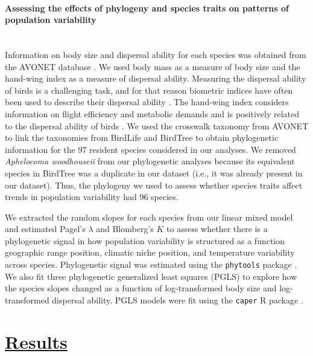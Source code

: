 \paragraph*{Assessing the effects of phylogeny and species traits on patterns of population variability}\mbox{}\\ 
Information on body size and dispersal ability for each species was obtained from the AVONET database \parencite{tobias2022}. We used body mass as a measure of body size and the hand-wing index as a measure of dispersal ability. Measuring the dispersal ability of birds is a challenging task, and for that reason biometric indices have often been used to describe their dispersal ability \parencite{sheard2020}. The hand-wing index considers information on flight efficiency and metabolic demands \parencite{claramunt2012,claramunt2017} and is positively related to the dispersal ability of birds \parencite{arango2022}. We used the crosswalk taxonomy from AVONET \parencite{tobias2022} to link the taxonomies from BirdLife and BirdTree \parencite{jetz2012bird} to obtain phylogenetic information for the 97 resident species considered in our analyses. We removed \textit{Aphelocoma woodhouseii} from our phylogenetic analyses because its equivalent species in BirdTree was a duplicate in our dataset (i.e., it was already present in our dataset). Thus, the phylogeny we used to assess whether species traits affect trends in population variability had 96 species.

We extracted the random slopes for each species from our linear mixed model and estimated Pagel's $\lambda$ and Blomberg's $K$ to assess whether there is a phylogenetic signal in how population variability is structured as a function geographic range position, climatic niche position, and temperature variability across species. Phylogenetic signal was estimated using the \texttt{phytools} package \parencite{revell2012}. We also fit three phylogenetic generalized least squares (PGLS) to explore how the species slopes changed as a function of log-transformed body size and log-transformed dispersal ability. PGLS models were fit using the \texttt{caper} R package \parencite{caper}.

\section*{\textbf{\underline{Results}}}
